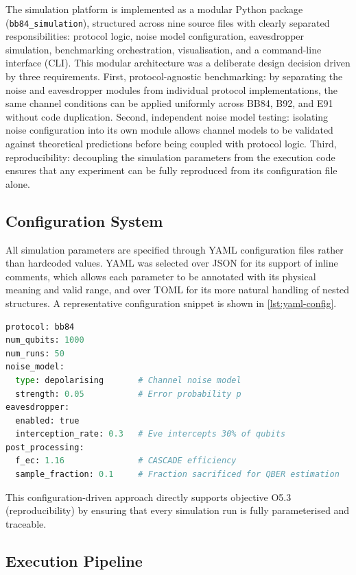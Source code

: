 The simulation platform is implemented as a modular Python package (\texttt{bb84\_simulation}), structured across nine source files with clearly separated responsibilities: protocol logic, noise model configuration, eavesdropper simulation, benchmarking orchestration, visualisation, and a command-line interface (CLI). This modular architecture was a deliberate design decision driven by three requirements. First, protocol-agnostic benchmarking: by separating the noise and eavesdropper modules from individual protocol implementations, the same channel conditions can be applied uniformly across BB84, B92, and E91 without code duplication. Second, independent noise model testing: isolating noise configuration into its own module allows channel models to be validated against theoretical predictions before being coupled with protocol logic. Third, reproducibility: decoupling the simulation parameters from the execution code ensures that any experiment can be fully reproduced from its configuration file alone.

\subsection{Configuration System}

All simulation parameters are specified through YAML configuration files rather than hardcoded values. YAML was selected over JSON for its support of inline comments, which allows each parameter to be annotated with its physical meaning and valid range, and over TOML for its more natural handling of nested structures. A representative configuration snippet is shown in \cref{lst:yaml-config}.

\begin{lstlisting}[language=Python, caption={Example YAML configuration for a BB84 simulation run}, label={lst:yaml-config}]
protocol: bb84
num_qubits: 1000
num_runs: 50
noise_model:
  type: depolarising       # Channel noise model
  strength: 0.05           # Error probability p
eavesdropper:
  enabled: true
  interception_rate: 0.3   # Eve intercepts 30% of qubits
post_processing:
  f_ec: 1.16               # CASCADE efficiency
  sample_fraction: 0.1     # Fraction sacrificed for QBER estimation
\end{lstlisting}

This configuration-driven approach directly supports objective O5.3 (reproducibility) by ensuring that every simulation run is fully parameterised and traceable.

\subsection{Execution Pipeline}

